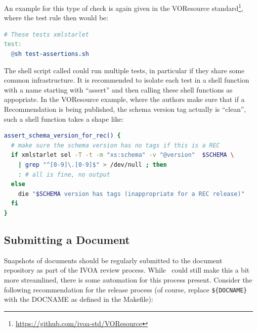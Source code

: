 \documentclass[11pt,a4paper]{ivoa}
\begin{document}
An example for this type of check is again given in the VOResource
standard\footnote{\url{https://github.com/ivoa-std/VOResource}}, where
the test rule then would be:

\begin{lstlisting}[language=make,basicstyle=\footnotesize]
# These tests xmlstarlet
test:
  @sh test-assertions.sh
\end{lstlisting}

The shell script called could run multiple tests, in particular if they
share some common infrastructure.  It is recommended to isolate each
test in a shell function with a name starting with ``assert'' and then
calling these shell functions as appopriate.  In the VOResource example,
where the authors make sure that if a Recommendation is being published,
the schema version tag actually is ``clean'', such a shell function
takes a shape like:

\begin{lstlisting}[language=sh,basicstyle=\footnotesize]
assert_schema_version_for_rec() {
  # make sure the schema version has no tags if this is a REC
  if xmlstarlet sel -T -t -m "xs:schema" -v "@version"  $SCHEMA \
    | grep "^[0-9]\.[0-9]$" > /dev/null ; then
    : # all is fine, no output
  else
    die "$SCHEMA version has tags (inappropriate for a REC release)"
  fi
}
\end{lstlisting}
\subsection{Submitting a Document}

Snapshots of documents should be regularly submitted to the document
repository as part of the IVOA review process.  While \ivoatex~could
still make this a bit more streamlined, there is some automation for
this process present.  Consider the following recommendation for the
release process (of course, replace \verb|${DOCNAME}| with the DOCNAME
as defined in the Makefile):
\end{document}
